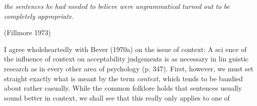 \begin{styleStandard}
\textit{the}\textit{ }\textit{sentences}\textit{ }\textit{he}\textit{ }\textit{had}\textit{ }\textit{needed}\textit{ }\textit{to}\textit{ }\textit{believe}\textit{ }\textit{were}\textit{ }\textit{ungrammatical}\textit{ }\textit{turned}\textit{ }\textit{out}\textit{ }\textit{to}\textit{ }\textit{be completely}\textit{ }\textit{appropriate.}
\end{styleStandard}


\begin{styleStandard}
(Fillmore 1973)
\end{styleStandard}


\begin{styleTextbody}
I agree wholeheartedly with Bever (1970a) on the issue of context: {\textquotedbl}A sci\- ence of the influence of context on acceptability judgements is as necessary in lin\- guistic research as in every other area of psychology{\textquotedbl} (p. 347). First, however, we must set straight exactly what is meant by the term \textit{context,}\textit{ }which tends to be bandied about rather casually. While the common folklore holds that sentences usually sound better in context, we shall see that this really only applies to one of
\end{styleTextbody}


